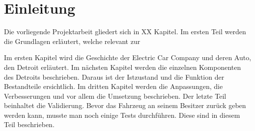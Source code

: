 \section{Einleitung}











Die vorliegende Projektarbeit gliedert sich in XX Kapitel. Im ersten Teil werden die Grundlagen erläutert, welche relevant zur 


Im ersten Kapitel wird die Geschichte der Electric Car Company und deren Auto, den Detroit erläutert.
Im nächsten Kapitel werden die einzelnen Komponenten des Detroits beschrieben. Daraus ist der Istzustand und die Funktion der Bestandteile ersichtlich. Im dritten Kapitel werden die Anpassungen, die Verbesserungen und vor allem die Umsetzung beschrieben. Der letzte Teil beinhaltet die Validierung. Bevor das Fahrzeug an seinem Besitzer zurück geben werden kann, musste man noch einige Tests durchführen. Diese sind in diesem Teil beschrieben.\\\\

















